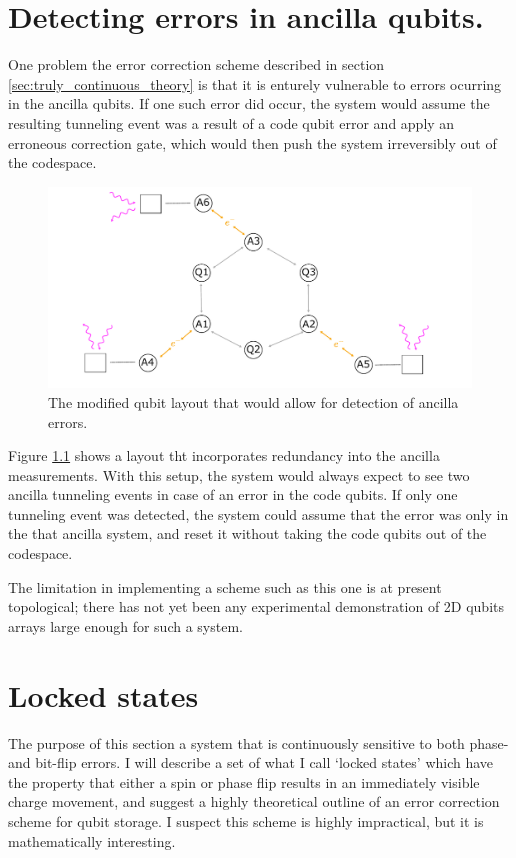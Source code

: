 \documentclass{report}
\begin{document}
\begin{appendices}
\chapter{Detecting errors in ancilla qubits.} \label{appendix:9qubitsystem}
One problem the error correction scheme described in section \ref{sec:truly_continuous_theory} is that it is enturely vulnerable to errors ocurring in the ancilla qubits. If one such error did occur, the system would assume the resulting tunneling event was a result of a code qubit error and apply an erroneous correction gate, which would then push the system irreversibly out of the codespace.
\begin{figure}[ht]
    \centering
    \includegraphics[scale = 0.9]{Figures/9q.pdf}
    \caption{The modified qubit layout that would allow for detection of ancilla errors.}
    \label{fig:9qubitlayout}
\end{figure}
Figure \ref{fig:9qubitlayout} shows a layout tht incorporates redundancy into the ancilla measurements. With this setup, the system would always expect to see two ancilla tunneling events in case of an error in the code qubits. If only one tunneling event was detected, the system could assume that the error was only in the that ancilla system, and reset it without taking the code qubits out of the codespace.

The limitation in implementing a scheme such as this one is at present topological; there has not yet been any experimental demonstration of 2D qubits arrays large enough for such a system.
\chapter{Locked states} \label{appendix:lockedstates}
The purpose of this section a system that is continuously sensitive to both phase- and bit-flip errors. I will describe a set of what I call `locked states' which have the property that either a spin or phase flip results in an immediately visible charge movement, and suggest a highly theoretical outline of an error correction scheme for qubit storage. I suspect this scheme is highly impractical, but it is mathematically interesting.


\end{appendices}
\end{document}
